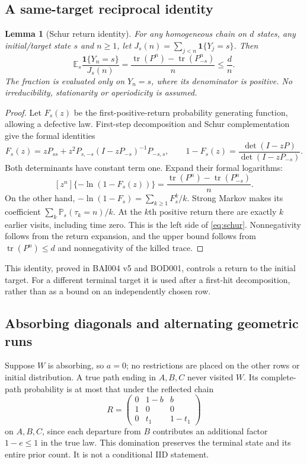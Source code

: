 \documentclass[11pt,letterpaper]{article}
\newtheorem{lemma}[theorem]{Lemma}
\theoremstyle{definition}\newtheorem{definition}[theorem]{Definition}
\theoremstyle{remark}\newtheorem{remark}[theorem]{Remark}
\newcommand{\E}{\mathbb{E}}
\newcommand{\Prob}{\mathbb{P}}
\newcommand{\ind}{\mathbf{1}}
\newcommand{\unit}[1]{\textsf{#1}}
\begin{document}
\subsection{A same-target reciprocal identity}
\begin{lemma}[Schur return identity]\label{lem:schur}
For any homogeneous chain on $d$ states, any initial/target state $s$ and $n\ge1$, let $J_s(n)=\sum_{j<n}\ind\{Y_j=s\}$. Then
\begin{equation}\label{eq:schur}
 \E_s\frac{\ind\{Y_n=s\}}{J_s(n)}
 =\frac{\operatorname{tr}(P^n)-\operatorname{tr}(P_{-s}^n)}n
 \le\frac dn .
\end{equation}
The fraction is evaluated only on $Y_n=s$, where its denominator is positive. No irreducibility, stationarity or aperiodicity is assumed.
\end{lemma}
\begin{proof}
Let $F_s(z)$ be the first-positive-return probability generating function, allowing a defective law. First-step decomposition and Schur complementation give the formal identities
\[
 F_s(z)=zP_{ss}+z^2P_{s,-s}(I-zP_{-s})^{-1}P_{-s,s},
 \qquad
 1-F_s(z)=\frac{\det(I-zP)}{\det(I-zP_{-s})}.
\]
Both determinants have constant term one. Expand their formal logarithms:
\[
 [z^n]\{-\ln(1-F_s(z))\}
 =\frac{\operatorname{tr}(P^n)-\operatorname{tr}(P_{-s}^n)}n.
\]
On the other hand, $-\ln(1-F_s)=\sum_{k\ge1}F_s^k/k$. Strong Markov makes its coefficient
$\sum_k\Prob_s(\tau_k=n)/k$. At the $k$th positive return there are exactly $k$ earlier visits, including time zero. This is the left side of \eqref{eq:schur}. Nonnegativity follows from the return expansion, and the upper bound follows from $\operatorname{tr}(P^n)\le d$ and nonnegativity of the killed trace.
\end{proof}

This identity, proved in \unit{BAI004 v5} and \unit{BOD001}, controls a return to the initial target. For a different terminal target it is used after a first-hit decomposition, rather than as a bound on an independently chosen row.

\subsection{Absorbing diagonals and alternating geometric runs}
Suppose $W$ is absorbing, so $a=0$; no restrictions are placed on the other rows or initial distribution. A true path ending in $A,B,C$ never visited $W$. Its complete-path probability is at most that under the reflected chain
\[
 R=\begin{pmatrix}0&1-b&b\\1&0&0\\0&t_1&1-t_1\end{pmatrix}
\]
on $A,B,C$, since each departure from $B$ contributes an additional factor $1-e\le1$ in the true law. This domination preserves the terminal state and its entire prior count. It is not a conditional IID statement.
\end{document}

